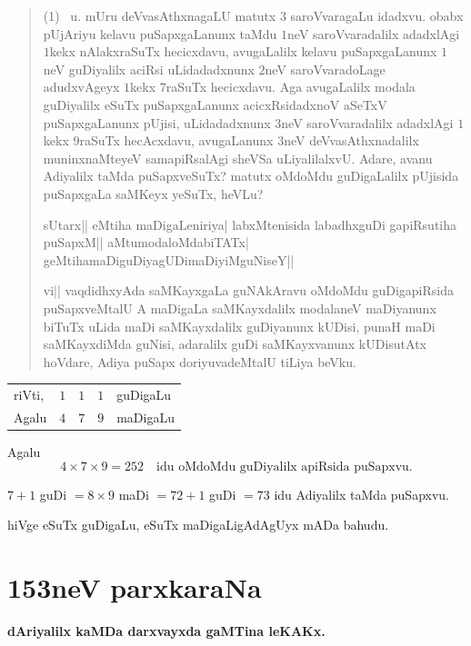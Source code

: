 \begin{verse}
{\rm(1)}~ u. mUru deVvasAthxnagaLU matutx $3$ saroVvaragaLu
idadxvu. obabx pUjAriyu kelavu puSapxgaLanunx taMdu $1$neV
saroVvaradalilx adadxlAgi $1$kekx nAlakxraSuTx hecicxdavu, avugaLalilx
kelavu puSapxgaLanunx $1$neV guDiyalilx aciRsi uLidadadxnunx $2$neV
saroVvaradoLage adudxvAgeyx $1$kekx $7$raSuTx hecicxdavu. Aga
avugaLalilx modala guDiyalilx eSuTx puSapxgaLanunx acicxRsidadxnoV
aSeTxV puSapxgaLanunx pUjisi, uLidadadxnunx $3$neV saroVvaradalilx
adadxlAgi $1$kekx $9$raSuTx hecAcxdavu, avugaLanunx $3$neV
deVvasAthxnadalilx muninxnaMteyeV samapiRsalAgi sheVSa
uLiyalilalxvU. Adare, avanu Adiyalilx taMda puSapxveSuTx? matutx
oMdoMdu guDigaLalilx pUjisida puSapxgaLa saMKeyx yeSuTx, heVLu? 

sUtarx|| eMtiha maDigaLeniriya| labxMtenisida labadhxguDi gapiRsutiha
puSapxM|| aMtumodaloMdabiTATx| geMtihamaDiguDiyagUDimaDiyiMguNiseY|| 

vi|| vaqdidhxyAda saMKayxgaLa guNAkAravu oMdoMdu guDigapiRsida
puSapxveMtalU A maDigaLa saMKayxdalilx modalaneV maDiyanunx biTuTx
uLida maDi saMKayxdalilx guDiyanunx kUDisi, punaH maDi saMKayxdiMda
guNisi, adaralilx guDi saMKayxvanunx kUDisutAtx hoVdare, Adiya puSapx
doriyuvadeMtalU tiLiya beVku. 
\end{verse}

\begin{center}
\begin{tabular}{l@{\qquad\qquad}c|cc@{\qquad}l}
riVti, & $1$ & $1$ & $1$ & guDigaLu\\[3pt]
Agalu & $4$ & $7$ & $9$ & maDigaLu
\end{tabular}
\end{center}

Agalu
$$
4\times 7\times 9=252\quad\text{idu oMdoMdu guDiyalilx apiRsida puSapxvu.}
$$

$7+1$ guDi $=8\times 9$ maDi $=72+1$ guDi $=73$ idu Adiyalilx taMda
puSapxvu. 

hiVge eSuTx guDigaLu, eSuTx maDigaLigAdAgUyx mADa bahudu.


\chapter{153neV parxkaraNa}

\begin{center}
{\large\bf dAriyalilx kaMDa darxvayxda gaMTina leKAKx.}
\end{center}

